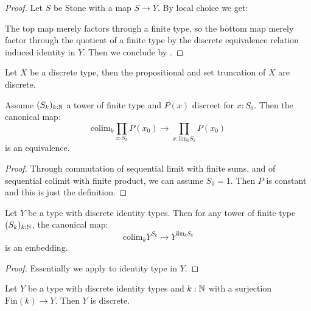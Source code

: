 \begin{proof}
Let $S$ be Stone with a map $S\to Y$. By local choice we get:
 \begin{center}
\end{center}
The top map merely factors through a finite type, so the bottom map merely factor through the quotient of a finite type by the discrete equivalence relation induced identity in $Y$. Then we conclude by .
\end{proof}

\begin{corollary}\label{prop-set-truncation-discrete}
Let $X$ be a discrete type, then the propositional and set truncation of $X$ are discrete.
\end{corollary}

\begin{lemma}\label{discrete-continuity-dependent}
Assume $(S_k)_{k:\mathbb{N}}$ a tower of finite type and $P(x)$ discreet for $x:S_0$. Then the canonical map:
\[\mathrm{colim}_k\prod_{x:S_k}P(x_0) \to \prod_{x:\mathrm{lim}_kS_k}P(x_0)\]
is an equivalence.
\end{lemma}

\begin{proof}
Through commutation of sequential limit with finite sums, and of sequential colimit with finite product, we can assume $S_0 = 1$. Then $P$ is constant and this is just the definition.
\end{proof}

\begin{lemma}
Let $Y$ be a type with discrete identity types. Then for any tower of finite type $(S_k)_{k:\mathbb{N}}$, the canonical map:
\[\mathrm{colim}_kY^{S_k} \to Y^{\mathrm{lim}_kS_k}\]
is an embedding.
\end{lemma}

\begin{proof}
Essentially we apply  to identity type in $Y$. 
\end{proof}

\begin{lemma}\label{higher-quotient-finite-discrete-discrete}
Let $Y$ be a type with discrete identity types and $k:\mathbb{N}$ with a surjection $\mathrm{Fin}(k)\to Y$. Then $Y$ is discrete.
\end{lemma}

